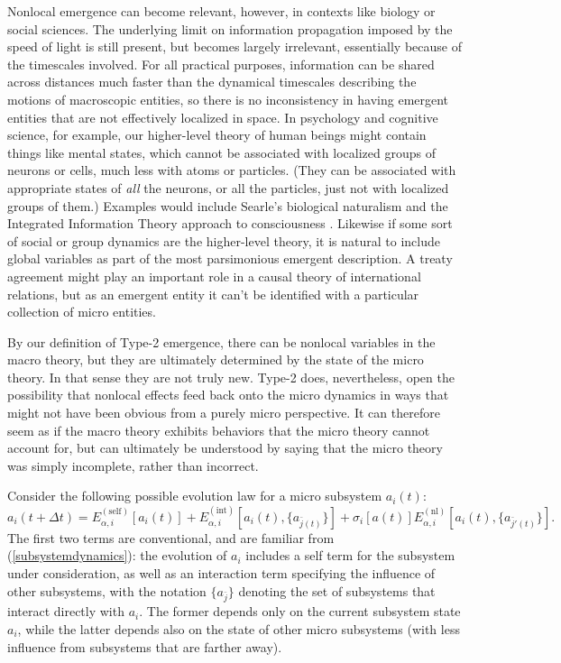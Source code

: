 \documentclass[12pt,english]{article}
\newcommand{\be}{\begin{equation}}
\newcommand{\ee}{\end{equation}}
\newcommand{\achyuth}[1]{\textcolor{red}{#1}}
\newcommand{\autocite}{\cite}
\begin{document}
Nonlocal emergence can become relevant, however, in contexts like biology or social sciences.
The underlying limit on information propagation imposed by the speed of light is still present, but becomes largely irrelevant, essentially because of the timescales involved.
For all practical purposes, information can be shared across distances much faster than the dynamical timescales describing the motions of macroscopic entities, so there is no inconsistency in having emergent entities that are not effectively localized in space.
In psychology and cognitive science, for example, our higher-level theory of human beings might contain things like mental states, which cannot be associated with localized groups of neurons or cells, much less with atoms or particles.
(They can be associated with appropriate states of \emph{all} the neurons, or all the particles, just not with localized groups of them.) 
Examples would include Searle's biological naturalism \autocite{Searle2007-SEABN-2} and the Integrated Information Theory approach to consciousness \autocite{Tononi2016}.
Likewise if some sort of social or group dynamics are the higher-level theory, it is natural to include global variables as part of the most parsimonious emergent description.
A treaty agreement might play an important role in a causal theory of international relations, but as an emergent entity it can't be identified with a particular collection of micro entities.


By our definition of Type-2 emergence, there can be nonlocal variables in the macro theory, but they are ultimately determined by the state of the micro theory.
In that sense they are not truly new.
Type-2 does, nevertheless, open the possibility that nonlocal effects feed back onto the micro dynamics in ways that might not have been obvious from a purely micro perspective.
It can therefore seem as if the macro theory exhibits behaviors that the micro theory cannot account for, but can ultimately be understood by saying that the micro theory was simply incomplete, rather than incorrect.

Consider the following possible evolution law for a micro subsystem $a_i(t)$:
\be
  a_i(t+\Delta t) = E_{\alpha, i}^{(\mathrm{self})}[a_i(t)] 
  + E_{\alpha,i}^{(\mathrm{int})}[a_i(t), \{a_{\bar{j}(t)}\}] 
  + \sigma_i[a(t)] E_{\alpha,i}^{(\mathrm{nl})}[a_i(t),\{a_{\bar{j}'(t)}\}] .
  \label{nonlocaldynamics}
\ee
The first two terms are conventional, and are familiar from (\ref{subsystemdynamics}): the evolution of $a_i$ includes a self term for the subsystem under consideration, as well as an interaction term specifying the influence of other subsystems, with the notation $\{a_{\bar{j}}\}$ denoting the set of subsystems that interact directly with $a_i$.
The former depends only on the current subsystem state $a_i$, while the latter depends also on the state of other micro subsystems (with less influence from subsystems that are farther away).
\end{document}

